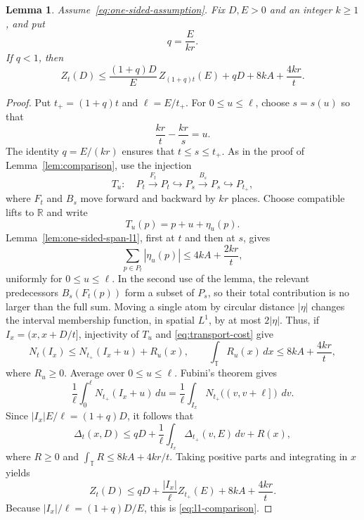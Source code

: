 \documentclass[11pt]{article}
\newtheorem{lemma}[theorem]{Lemma}
\theoremstyle{remark}
\numberwithin{equation}{section}
\newcommand{\T}{\mathbb{T}}
\newcommand{\R}{\mathbb{R}}
\begin{document}
\begin{lemma}\label{lem:l1-comparison}
Assume~\eqref{eq:one-sided-assumption}. Fix $D,E>0$ and an integer
$k\geq1$, and put
\[
  q=\frac{E}{kr}.
\]
If $q<1$, then
\begin{equation}\label{eq:l1-comparison}
  Z_t(D)
  \leq \frac{(1+q)D}{E}\,Z_{(1+q)t}(E)
       +qD+8kA+\frac{4kr}{t}.
\end{equation}
\end{lemma}
\begin{proof}
Put $t_+=(1+q)t$ and $\ell=E/t_+$. For $0\leq u\leq\ell$, choose
$s=s(u)$ so that
\[
  \frac{kr}{t}-\frac{kr}{s}=u.
\]
The identity $q=E/(kr)$ ensures that $t\leq s\leq t_+$. As in the proof
of Lemma~\ref{lem:comparison}, use the injection
\[
  T_u:\quad
  P_t\xrightarrow{F_t}P_t
  \hookrightarrow P_s\xrightarrow{B_s}P_s
  \hookrightarrow P_{t_+},
\]
where $F_t$ and $B_s$ move forward and backward by $kr$ places.
Choose compatible lifts to $\R$ and write
\[
  T_u(p)=p+u+\eta_u(p).
\]
Lemma~\ref{lem:one-sided-span-l1}, first at $t$ and then at $s$, gives
\begin{equation}\label{eq:transport-cost}
  \sum_{p\in P_t}|\eta_u(p)|
  \leq4kA+\frac{2kr}{t},
\end{equation}
uniformly for $0\leq u\leq\ell$. In the second use of the lemma, the
relevant predecessors $B_s(F_t(p))$ form a subset of $P_s$, so their
total contribution is no larger than the full sum.
Moving a single atom by circular distance $|\eta|$ changes the interval
membership function, in spatial $L^1$, by at most $2|\eta|$. Thus, if
$I_x=(x,x+D/t]$, injectivity of $T_u$ and
\eqref{eq:transport-cost} give
\[
  N_t(I_x)\leq N_{t_+}(I_x+u)+R_u(x),
  \qquad
  \int_{\T}R_u(x)\,dx\leq8kA+\frac{4kr}{t},
\]
where $R_u\geq0$. Average over $0\leq u\leq\ell$. Fubini's theorem gives
\[
  \frac1\ell\int_0^\ell N_{t_+}(I_x+u)\,du
  =\frac1\ell\int_{I_x}N_{t_+}((v,v+\ell])\,dv.
\]
Since $|I_x|E/\ell=(1+q)D$, it follows that
\[
  \Delta_t(x,D)
  \leq qD+\frac1\ell\int_{I_x}\Delta_{t_+}(v,E)\,dv+R(x),
\]
where $R\geq0$ and
$\int_{\T}R\leq8kA+4kr/t$. Taking positive parts and integrating in $x$
yields
\[
  Z_t(D)
  \leq qD+\frac{|I_x|}{\ell}Z_{t_+}(E)
       +8kA+\frac{4kr}{t}.
\]
Because $|I_x|/\ell=(1+q)D/E$, this is
\eqref{eq:l1-comparison}.
\end{proof}
\end{document}
